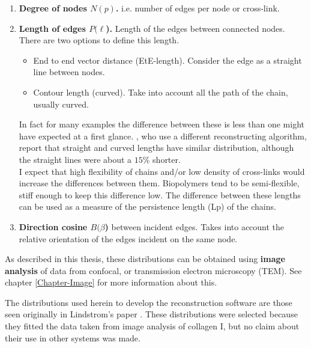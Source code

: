 \begin{enumerate}
\item \textbf{Degree of nodes $N(p)$.} i.e. number of edges per node
or cross-link.
\item \textbf{Length of edges $P(\ell$).} Length of the edges
between connected nodes.
There are two options to define this length.
\begin{itemize}
\item End to end vector distance (EtE-length). Consider the edge as a straight
line between nodes.

\item Contour length (curved). Take into account all the path of the chain,
usually curved.
\end{itemize}

In fact for many examples the difference between these is less than one
might have expected at a first glance. \citet{nisslert_identification_2007},
who use a different reconstructing algorithm, report that straight and curved
lengths have similar distribution, although the straight lines were about a
$15\%$ shorter.\\
I expect that high flexibility of chains and/or low density of cross-links
would increase the differences between them. Biopolymers tend to be semi-flexible, stiff
enough to keep this difference low.
The difference between these lengths can be used as a measure of the
persistence length (\gls{Lp}) of the chains.


\item \textbf{Direction cosine $B(\beta$)} between incident edges. Takes into
account the relative orientation of the edges incident on the same node.


\end{enumerate}

As described in this thesis, these distributions can be obtained using \textbf{image analysis} of data from
\gls{confocal}, or transmission electron microscopy (\gls{TEM}). See chapter \ref{Chapter-Image} for
more information about this.

The distributions used herein to develop the reconstruction software are those seen originally in
Lindstrom's paper \citep{lindstrom_biopolymer_2010}. These
distributions were selected because they fitted the data taken from image analysis of collagen I, but
no claim about their use in other systems was made.

